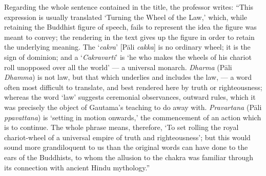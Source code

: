 \documentclass[a4paper, 11pt, oneside, polutonikogreek, english]{article}
\begin{document}
Regarding the whole sentence contained in the title, the professor writes: ``This expression is usually translated `Turning the Wheel of the Law,' which, while retaining the Buddhist figure of speech, fails to represent the idea the figure was meant to convey; the rendering in the text gives up the figure in order to retain the underlying meaning. The `\emph{cakra}' [Pāli \emph{cakka}] is no ordinary wheel; it is the sign of dominion; and a `\emph{Cakravarti}' is `he who makes the wheels of his chariot roll unopposed over all the world' --- a universal monarch. \emph{Dharma} (Pāli \emph{Dhamma}) is not law, but that which underlies and includes the law, --- a word often most difficult to translate, and best rendered here by truth or righteousness; whereas the word `law' suggests ceremonial observances, outward rules, which it was precisely the object of Gautama's teaching to do away with. \emph{Pravartana} (Pāli \emph{ppavattana}) is `setting in motion onwards,' the commencement of an action which is to continue. The whole phrase means, therefore, `To set rolling the royal chariot-wheel of a universal empire of truth and righteousness'; but this would sound more grandiloquent to us than the original words can have done to the ears of the Buddhists, to whom the allusion to the chakra was familiar through its connection with ancient Hindu mythology.''
\end{document}

